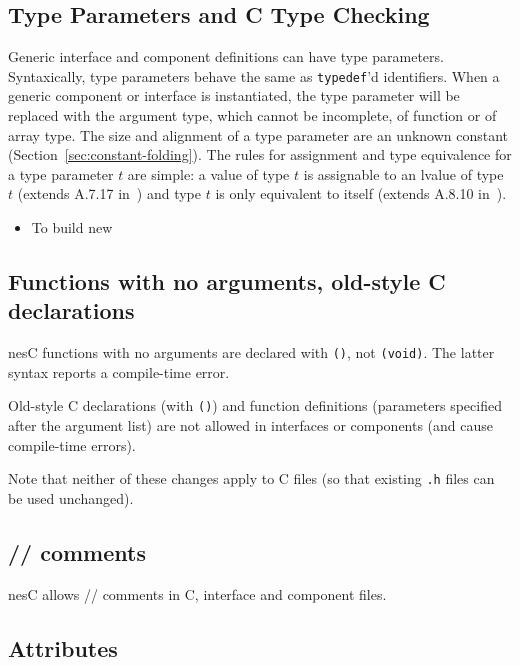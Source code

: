 \documentclass[11pt,letterpaper]{article}
\newcommand{\kw}[1]{{\tt #1}}
\newcommand{\code}[1]{{\tt #1}}
\newcommand{\file}[1]{{\tt #1}}
\newcommand{\nesc}{nesC\xspace}
\begin{document}
\subsection{Type Parameters and C Type Checking}
\label{sec:type-parameters}

Generic interface and component definitions can have type
parameters. Syntaxically, type parameters behave the same as \kw{typedef}'d
identifiers. When a generic component or interface is instantiated, the
type parameter will be replaced with the argument type, which cannot be
incomplete, of function or of array type. The size and alignment of a type
parameter are an unknown constant (Section~\ref{sec:constant-folding}).
The rules for assignment and type equivalence for a type parameter $t$ are
simple: a value of type $t$ is assignable to an lvalue of type $t$ (extends
A.7.17 in~\cite{kandr}) and type $t$ is only equivalent to itself (extends
A.8.10 in~\cite{kandr}).


\begin{itemize}
\item To build new 
\end{itemize}

\subsection{Functions with no arguments, old-style C declarations}
\label{sec:misc-void}

\nesc functions with no arguments are declared with \code{()}, not
\code{(void)}. The latter syntax reports a compile-time error.

Old-style C declarations (with \code{()}) and function definitions 
(parameters specified after the argument list) are not allowed in
interfaces or components (and cause compile-time errors).

Note that neither of these changes apply to C files (so that existing
\file{.h} files can be used unchanged).

\subsection{// comments}

\nesc allows // comments in C, interface and component files.

\subsection{Attributes}
\label{sec:attributes}
\end{document}
